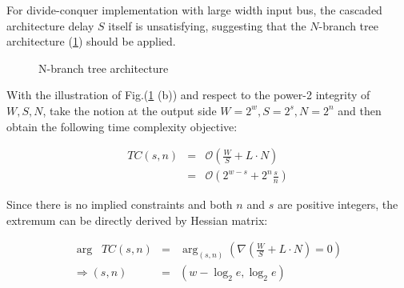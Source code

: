 \documentclass[journal, onecolumn]{IEEEtran}
\begin{document}
For divide-conquer implementation with large width input bus, the cascaded architecture delay \(S\) itself is unsatisfying, suggesting that the \(N\)-branch tree architecture (\ref{n_branch_tree}) should be applied.

\begin{figure}[htpb]
  \begin{center}
    \hspace{0.05\textwidth}
    \caption{N-branch tree architecture}
    \label{n_branch_tree}
  \end{center}
\end{figure}

With the illustration of Fig.(\ref{n_branch_tree} (b)) and respect to the power-2 integrity of \(W, S, N\), take the notion at the output side \(W=2^{w}, S=2^{s}, N=2^{n}\) and then obtain the following time complexity objective:

\begin{eqnarray}
  TC(s,n)&=&\mathcal{O}\left(\frac{W}{S}+L\cdot N\right) \\
  &=&\mathcal{O}\left(2^{w-s}+2^{n}\frac{s}{n}\right)
\end{eqnarray}

Since there is no implied constraints and both \(n\) and \(s\) are positive integers, the extremum can be directly derived by Hessian matrix:

\begin{eqnarray}
  \mathop{\mathrm{arg}\ \min_{(s,n)}}\ TC(s,n) &=& \mathop{\mathrm{arg}}_{(s,n)} \left(\nabla\left(\frac{W}{S}+L\cdot N\right)=0\right) \\
  \Rightarrow (s,n) &=& (w-\log_2 e, \log_2 e)
\end{eqnarray}
\end{document}
